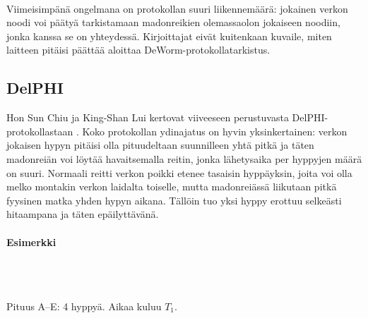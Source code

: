 \documentclass[finnish]{tktltiki2}
\theoremstyle{definition}
\theoremstyle{remark}
\begin{document}
\noindent \\
Viimeisimpänä ongelmana on protokollan suuri liikennemäärä: jokainen verkon noodi voi päätyä tarkistamaan madonreikien olemassaolon jokaiseen noodiin, jonka kanssa se on yhteydessä. Kirjoittajat eivät kuitenkaan kuvaile, miten laitteen pitäisi päättää aloittaa DeWorm-protokollatarkistus.

% 
% 
% 
% 
% 
% 
% 
% 
% 
% 
\subsection{DelPHI}
% 
% 
% 
% 
% 
% 
% 
% 
% 
% 
% 
% 

Hon Sun Chiu ja King-Shan Lui kertovat viiveeseen perustuvasta DelPHI-protokollastaan \cite{delphi}. Koko protokollan ydinajatus on hyvin yksinkertainen: verkon jokaisen hypyn pitäisi olla pituudeltaan suunnilleen yhtä pitkä ja täten madonreiän voi löytää havaitsemalla reitin, jonka lähetysaika per hyppyjen määrä on suuri. Normaali reitti verkon poikki etenee tasaisin hyppäyksin, joita voi olla melko montakin verkon laidalta toiselle, mutta madonreiässä liikutaan pitkä fyysinen matka yhden hypyn aikana. Tällöin tuo yksi hyppy erottuu selkeästi hitaampana ja täten epäilyttävänä.

\paragraph{Esimerkki}

\noindent\\

\noindent\\
Pituus A--E: 4 hyppyä. Aikaa kuluu $T_1$.

\noindent\\
\end{document}
